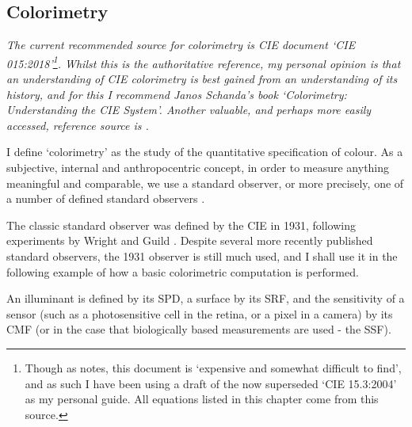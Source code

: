 \subsection{Colorimetry}

\textit{The current recommended source for colorimetry is \gls{CIE} document `\gls{CIE} 015:2018'\citep{cie_cie_2018}\footnote{Though as \citet{fairchild_cie_2019} notes, this document is `expensive and somewhat difficult to find', and as such I have been using a draft of the now superseded `\gls{CIE} 15.3:2004'\citep{cie_cie_2004-2} as my personal guide. All equations listed in this chapter come from this source.}. Whilst this is the authoritative reference, my personal opinion is that an understanding of \gls{CIE} colorimetry is best gained from an understanding of its history, and for this I recommend Janos Schanda's book `Colorimetry: Understanding the \gls{CIE} System'\citep{schanda_colorimetry_2007}. Another valuable, and perhaps more easily accessed, reference source is \citet{stockman_color_2010}.}

\bigskip

I define `colorimetry' as the study of the quantitative specification of colour. As a subjective, internal and anthropocentric concept, in order to measure anything meaningful and comparable, we use a standard observer, or more precisely, one of a number of defined standard observers \cite{cie_bs_2011}.

The classic standard observer was defined by the \gls{CIE} in 1931, following experiments by Wright and Guild \cite{wright_re-determination_1929, guild_colorimetric_1931}. Despite several more recently published standard observers, the 1931 observer is still much used, and I shall use it in the following example of how a basic colorimetric computation is performed.


An illuminant is defined by its \gls{SPD}, a surface by its \gls{SRF}, and the sensitivity of a sensor (such as a photosensitive cell in the retina, or a pixel in a camera) by its \gls{CMF} (or in the case that biologically based measurements are used - the \gls{SSF}).

